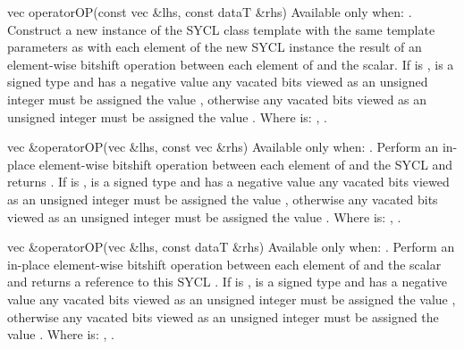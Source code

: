    \addRow
  {vec operatorOP(const vec \&lhs, const dataT \&rhs)}
  {
    Available only when: .
    \newline
    Construct a new instance of the SYCL  class template with the same template parameters as   with each element of the new SYCL  instance the result of an element-wise  bitshift operation between each element of   and the  scalar. If  is \codeinline{>>},  is a signed type and   has a negative value any vacated bits viewed as an unsigned integer must be assigned the value , otherwise any vacated bits viewed as an unsigned integer must be assigned the value .
    \newline \newline
    Where  is: \codeinline{<<}, \codeinline{>>}.
  }
  
  \addRow
  {vec \&operatorOP(vec \&lhs, const vec \&rhs)}
  {
    Available only when: .
    \newline
    Perform an in-place element-wise  bitshift operation between each element of   and the  SYCL  and returns  . If  is \codeinline{>>\=},  is a signed type and   has a negative value any vacated bits viewed as an unsigned integer must be assigned the value , otherwise any vacated bits viewed as an unsigned integer must be assigned the value .
    \newline \newline
    Where  is: \codeinline{<<\=}, \codeinline{>>\=}.
  }

  \addRow
  {vec \&operatorOP(vec \&lhs, const dataT \&rhs)}
  {
    Available only when: .
    \newline
    Perform an in-place element-wise  bitshift operation between each element of   and the  scalar and returns a reference to this SYCL . If  is \codeinline{>>\=},  is a signed type and   has a negative value any vacated bits viewed as an unsigned integer must be assigned the value , otherwise any vacated bits viewed as an unsigned integer must be assigned the value .
    \newline \newline
    Where  is: \codeinline{<<\=}, \codeinline{>>\=}.
  }

